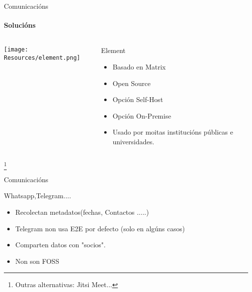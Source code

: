 \documentclass{beamer}
\begin{document}

\begin{frame}{Comunicacións}
  \framesubtitle{Solucións}

  \begin{columns}
    \begin{column}{0.5\textwidth}
      \texttt{[image: Resources/element.png]}

      \vspace{1cm}


    \end{column}

    \begin{column}{0.4\textwidth}
      \begin{block}{Element}
        \begin{itemize}
          \item Basado en Matrix
          \item Open Source
          \item Opción Self-Host
          \item Opción On-Premise
          \item Usado por moitas institucións públicas e universidades.
        \end{itemize}
      \end{block}

    \end{column}

  \end{columns}

  \footnote{Outras alternativas: Jitsi Meet...}

\end{frame}






\begin{frame}{Comunicacións}
  \subtitle{Problema}

  \begin{block}{Whatsapp,Telegram....}

    \begin{itemize}
      \item Recolectan metadatos(fechas, Contactos .....)
      \item Telegram non usa E2E por defecto (solo en algúns casos)
      \item Comparten datos con "socios".
      \item Non son FOSS
    \end{itemize}

  \end{block}

\end{frame}
\end{document}
